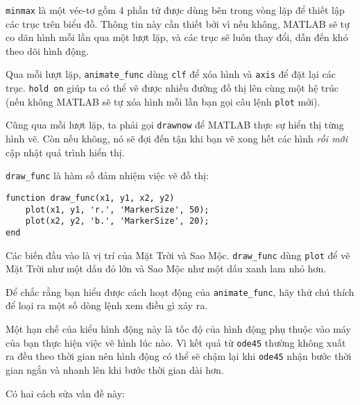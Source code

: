 \documentclass[12pt]{book}
\begin{document}
{\tt minmax}  là một véc-tơ gồm 4 phần tử được dùng bên trong 
vòng lặp để thiết lập các trục trên biểu đồ. Thông tin này cần thiết
bởi vì nếu không, MATLAB sẽ tự co dãn hình mỗi lần qua một
lượt lặp, và các trục sẽ luôn thay đổi, dẫn đến khó theo dõi
hình động.

Qua mỗi lượt lặp, \verb#animate_func# dùng {\tt clf}
để xóa hình và {\tt axis} để đặt lại các trục.  {\tt hold on} 
giúp ta có thể vẽ được nhiều đường đồ thị lên cùng một 
hệ trúc (nếu không MATLAB sẽ tự xóa hình mỗi lần
bạn gọi câu lệnh {\tt plot} mới).

Cũng qua mỗi lượt lặp, ta phải gọi {\tt drawnow} để
MATLAB thực sự hiển thị từng hình vẽ. Còn nếu không, nó sẽ
đợi đến tận khi bạn vẽ xong hết các hình {\em rồi mới} 
cập nhật quá trình hiển thị.

\verb#draw_func# là hàm số đảm nhiệm việc vẽ đồ thị:

\begin{verbatim}
function draw_func(x1, y1, x2, y2)
    plot(x1, y1, 'r.', 'MarkerSize', 50);
    plot(x2, y2, 'b.', 'MarkerSize', 20);
end
\end{verbatim}
%
Các biến đầu vào là vị trí của Mặt Trời và Sao Mộc. \verb#draw_func#
dùng {\tt plot} để vẽ Mặt Trời như một dấu đỏ lớn và Sao Mộc như
một dấu xanh lam nhỏ hơn.

\begin{ex}
Để chắc rằng bạn hiểu được cách hoạt động của \verb#animate_func#,
hãy thử chú thích để loại ra một số dòng lệnh xem điều gì xảy ra.
\end{ex}

Một hạn chế của kiểu hình động này là tốc độ của hình động phụ thuộc
vào máy của bạn thực hiện việc vẽ hình lúc nào. Vì kết quả từ
{\tt ode45} thường không xuất ra đều theo thời gian nên hình động
có thể sẽ chậm lại khi {\tt ode45} nhận bước thời gian ngắn và
nhanh lên khi bước thời gian dài hơn.

Có hai cách sửa vấn đề này:
\end{document}
